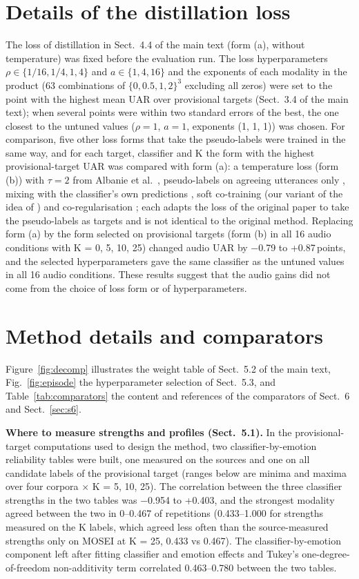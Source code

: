 \documentclass[sn-nature,pdflatex]{sn-jnl}
\newcommand{\pt}{\,points}
\begin{document}
\section{Details of the distillation loss}\label{sec:s4}
The loss of distillation in Sect.~4.4 of the main text (form (a), without temperature) was fixed before the evaluation run. The loss hyperparameters $\rho\in\{1/16,1/4,1,4\}$ and $a\in\{1,4,16\}$ and the exponents of each modality in the product (63 combinations of $\{0,0.5,1,2\}^3$ excluding all zeros) were set to the point with the highest mean UAR over provisional targets (Sect.~3.4 of the main text); when several points were within two standard errors of the best, the one closest to the untuned values ($\rho=1$, $a=1$, exponents (1, 1, 1)) was chosen. For comparison, five other loss forms that take the pseudo-labels were trained in the same way, and for each target, classifier and K the form with the highest provisional-target UAR was compared with form (a): a temperature loss (form (b)) \cite{hinton2015distilling} with $\tau=2$ from Albanie et al.\ \cite{albanie2018}, pseudo-labels on agreeing utterances only \cite{shi2024audioguided}, mixing with the classifier's own predictions \cite{zhang2021combining}, soft co-training (our variant of the idea of \cite{blum1998}) and co-regularisation \cite{sindhwani2005coreg}; each adapts the loss of the original paper to take the pseudo-labels as targets and is not identical to the original method. Replacing form (a) by the form selected on provisional targets (form (b) in all 16 audio conditions with K = 0, 5, 10, 25) changed audio UAR by $-$0.79 to +0.87\pt, and the selected hyperparameters gave the same classifier as the untuned values in all 16 audio conditions. These results suggest that the audio gains did not come from the choice of loss form or of hyperparameters.

\section{Method details and comparators}\label{sec:s5}
Figure~\ref{fig:decomp} illustrates the weight table of Sect.~5.2 of the main text, Fig.~\ref{fig:episode} the hyperparameter selection of Sect.~5.3, and Table~\ref{tab:comparators} the content and references of the comparators of Sect.~6 and Sect.~\ref{sec:s6}.

\textbf{Where to measure strengths and profiles (Sect.~5.1).} In the provisional-target computations used to design the method, two classifier-by-emotion reliability tables were built, one measured on the sources and one on all candidate labels of the provisional target (ranges below are minima and maxima over four corpora $\times$ K = 5, 10, 25). The correlation between the three classifier strengths in the two tables was $-$0.954 to +0.403, and the strongest modality agreed between the two in 0--0.467 of repetitions (0.433--1.000 for strengths measured on the K labels, which agreed less often than the source-measured strengths only on MOSEI at K = 25, 0.433 vs 0.467). The classifier-by-emotion component left after fitting classifier and emotion effects and Tukey's one-degree-of-freedom non-additivity term \cite{tukey1949} correlated 0.463--0.780 between the two tables.
\end{document}
